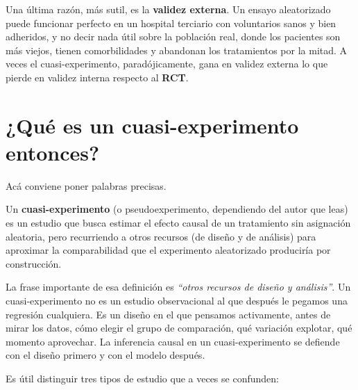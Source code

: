 \documentclass[
  letterpaper,
  DIV=11,
  numbers=noendperiod,
  oneside]{scrreprt}
\begin{document}
Una última razón, más sutil, es la \textbf{validez externa}. Un ensayo
aleatorizado puede funcionar perfecto en un hospital terciario con
voluntarios sanos y bien adheridos, y no decir nada útil sobre la
población real, donde los pacientes son más viejos, tienen
comorbilidades y abandonan los tratamientos por la mitad. A veces el
cuasi-experimento, paradójicamente, gana en validez externa lo que
pierde en validez interna respecto al \textbf{RCT}.

\hypertarget{quuxe9-es-un-cuasi-experimento-entonces}{%
\section{¿Qué es un cuasi-experimento
entonces?}\label{quuxe9-es-un-cuasi-experimento-entonces}}

Acá conviene poner palabras precisas.

\begin{tcolorbox}[enhanced jigsaw, breakable, colback=white, rightrule=.15mm, opacityback=0, colframe=quarto-callout-color-frame, bottomrule=.15mm, left=2mm, toprule=.15mm, leftrule=.75mm, arc=.35mm]
Un \textbf{cuasi-experimento} (o pseudoexperimento, dependiendo del
autor que leas) es un estudio que busca estimar el efecto causal de un
tratamiento sin asignación aleatoria, pero recurriendo a otros recursos
(de diseño y de análisis) para aproximar la comparabilidad que el
experimento aleatorizado produciría por construcción.
\end{tcolorbox}

La frase importante de esa definición es \emph{``otros recursos de
diseño y análisis''}. Un cuasi-experimento no es un estudio
observacional al que después le pegamos una regresión cualquiera. Es un
diseño en el que pensamos activamente, antes de mirar los datos, cómo
elegir el grupo de comparación, qué variación explotar, qué momento
aprovechar. La inferencia causal en un cuasi-experimento se defiende con
el diseño primero y con el modelo después.

Es útil distinguir tres tipos de estudio que a veces se confunden:
\end{document}
